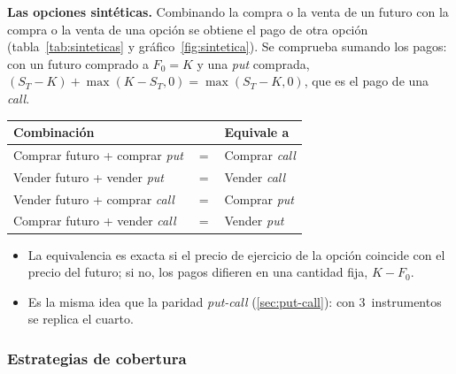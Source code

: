 \documentclass[11pt]{article}
\begin{document}
\begin{anotaciones}
\textbf{Las opciones sintéticas.} Combinando la compra o la venta de un futuro con la compra o la venta de una opción se obtiene el pago de otra opción (tabla~\ref{tab:sinteticas} y gráfico~\ref{fig:sintetica}). Se comprueba sumando los pagos: con un futuro comprado a $F_0=K$ y una \emph{put} comprada, $(S_T-K)+\max(K-S_T,0)=\max(S_T-K,0)$, que es el pago de una \emph{call}.
\begin{tablacaja}
\caption{Opciones sintéticas con futuros}\label{tab:sinteticas}
\begin{tabular}{>{\centering\arraybackslash}m{5cm}>{\centering\arraybackslash}m{1cm}>{\centering\arraybackslash}m{4.4cm}}
\toprule
\rowcolor{tceeazulpalido}\textbf{Combinación} & & \textbf{Equivale a}\\
\midrule
Comprar futuro + comprar \emph{put} & $=$ & \textcolor{tceeverde}{Comprar \emph{call}}\\
Vender futuro + vender \emph{put} & $=$ & \textcolor{tceedorado}{Vender \emph{call}}\\
Vender futuro + comprar \emph{call} & $=$ & \textcolor{tceeverde}{Comprar \emph{put}}\\
Comprar futuro + vender \emph{call} & $=$ & \textcolor{tceedorado}{Vender \emph{put}}\\
\bottomrule
\end{tabular}
\end{tablacaja}
\begin{figuracaja}
\caption{\emph{Call} sintética: futuro comprado y \emph{put} comprada}\label{fig:sintetica}
\end{figuracaja}
\begin{itemize}
\item La equivalencia es exacta si el precio de ejercicio de la opción coincide con el precio del futuro; si no, los pagos difieren en una cantidad fija, $K-F_0$.
\item Es la misma idea que la paridad \emph{put-call} (\ref{sec:put-call}): con 3~instrumentos se replica el cuarto.
\end{itemize}
\end{anotaciones}

\subsubsection{Estrategias de cobertura}\label{sec:opciones-cobertura}
\end{document}
